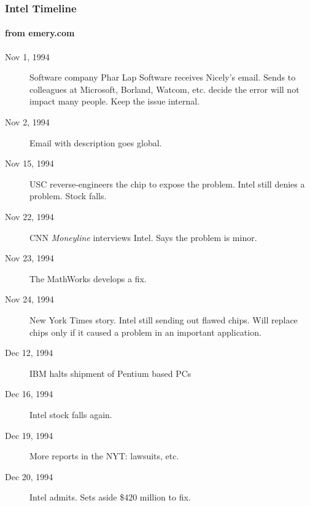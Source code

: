 \documentclass[10pt]{beamer}
\begin{document}
\begin{frame}
\frametitle{Intel Timeline}
\framesubtitle{from emery.com}
\begin{description}
\item[Nov 1, 1994]  Software company Phar Lap Software receives Nicely's
email.  Sends to colleagues at Microsoft, Borland, Watcom, etc.
decide the error will not impact many people.  Keep the issue internal.
\item[Nov 2, 1994]  Email with description goes global.
\item[Nov 15, 1994] USC reverse-engineers the chip to expose the problem.
Intel still denies a problem.  Stock falls.
\item[Nov 22, 1994] CNN \emph{Moneyline} interviews Intel.  Says the problem
is minor.
\item[Nov 23, 1994] The MathWorks develops a fix.
\item[Nov 24, 1994] New York Times story.  Intel still sending out flawed
chips.  Will replace chips only if it caused a problem in an important
application.
\item[Dec 12, 1994] IBM halts shipment of Pentium based PCs
\item[Dec 16, 1994] Intel stock falls again.
\item[Dec 19, 1994] More reports in the NYT: lawsuits, etc.
\item[Dec 20, 1994] Intel admits.  Sets aside \$420 million to fix.
\end{description}
\end{frame}
\end{document}
